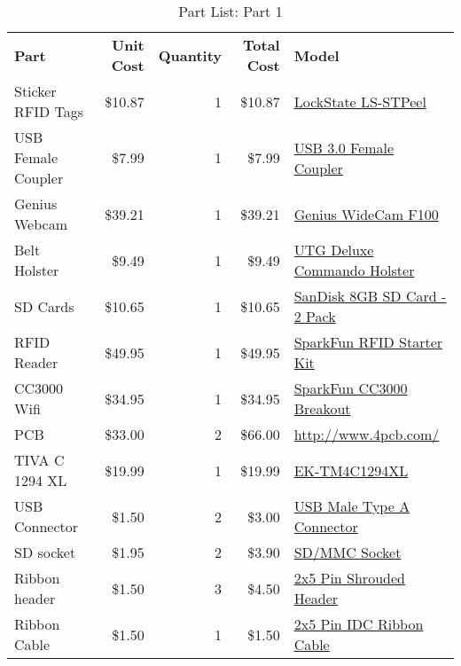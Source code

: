 \begin{table}[h]
    \centering
    \caption{Part List: Part 1}
    \vspace{1.0em}
    \begin{tabular}{lrrrl}
        \textbf{Part} & \textbf{Unit Cost} & \textbf{Quantity} & \textbf{Total Cost} & \textbf{Model}\\
        Sticker RFID Tags & \$10.87 & 1 & \$10.87 & \href{http://www.amazon.com/gp/product/B00UGHPWZK?psc=1&redirect=true&ref\_=oh\_aui\_detailpage\_o00\_s00}{LockState LS-STPeel}\\
        USB Female Coupler & \$7.99 & 1 & \$7.99 & \href{http://www.amazon.com/gp/product/B00J4NMTMQ?psc=1&redirect=true&ref\_=oh\_aui\_detailpage\_o02\_s00}{USB 3.0 Female Coupler}\\
        Genius Webcam & \$39.21 & 1 & \$39.21 & \href{http://www.amazon.com/gp/product/B0080CE5M4?psc=1&redirect=true&ref\_=oh\_aui\_detailpage\_o05\_s00}{Genius WideCam F100}\\
        Belt Holster & \$9.49 & 1 & \$9.49 & \href{http://www.amazon.com/gp/product/B0018LA0UK?psc=1&redirect=true&ref\_=oh\_aui\_detailpage\_o07\_s00}{UTG Deluxe Commando Holster}\\
        SD Cards & \$10.65 & 1 & \$10.65 & \href{http://www.amazon.com/gp/product/B00FM5E1EY?psc=1&redirect=true&ref\_=oh\_aui\_detailpage\_o06\_s00}{SanDisk 8GB SD Card - 2 Pack}\\
        RFID Reader & \$49.95 & 1 & \$49.95 & \href{https://www.sparkfun.com/products/13198}{SparkFun RFID Starter Kit}\\
        CC3000 Wifi & \$34.95 & 1 & \$34.95 & \href{https://www.sparkfun.com/products/12072}{SparkFun CC3000 Breakout}\\
        PCB & \$33.00 & 2 & \$66.00 & \href{http://www.4pcb.com/}{http://www.4pcb.com/}\\
        TIVA C 1294 XL & \$19.99 & 1 & \$19.99 & \href{https://store.ti.com/tiva-connected-launchpad.aspx}{EK-TM4C1294XL}\\
        USB Connector & \$1.50 & 2 & \$3.00 & \href{https://www.sparkfun.com/products/437}{USB Male Type A Connector}\\
        SD socket & \$1.95 & 2 & \$3.90 & \href{https://www.sparkfun.com/products/12769}{SD/MMC Socket}\\
        Ribbon header & \$1.50 & 3 & \$4.50 & \href{https://www.sparkfun.com/products/8506}{2x5 Pin Shrouded Header}\\
        Ribbon Cable & \$1.50 & 1 & \$1.50 & \href{https://www.sparkfun.com/products/8535}{2x5 Pin IDC Ribbon Cable}\\

\end{tabular}
\end{table}
